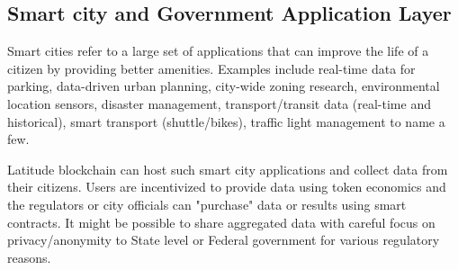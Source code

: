 %
%
%
%
\subsection{Smart city and Government Application Layer}

Smart cities refer to a large set of applications that can improve the life of a citizen by providing better amenities.
Examples include real-time data for parking, data-driven urban planning, city-wide zoning research,
environmental location sensors, disaster management, transport/transit data (real-time and historical), smart transport
(shuttle/bikes), traffic light management to name a few.

Latitude blockchain can host such smart city applications and collect data from their citizens. Users are incentivized
to provide data using token economics and the regulators or city officials can "purchase" data or results using smart
contracts. It might be possible to share aggregated data with careful focus on privacy/anonymity to State level or
Federal government for various regulatory reasons. 

